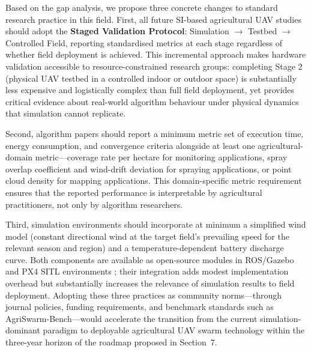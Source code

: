 \documentclass[review,3p,times]{elsarticle}
\begin{document}
Based on the gap analysis, we propose three concrete changes to standard research practice in this field. First, all future SI-based agricultural UAV studies should adopt the \textbf{Staged Validation Protocol}: Simulation $\rightarrow$ Testbed $\rightarrow$ Controlled Field, reporting standardised metrics at each stage regardless of whether field deployment is achieved. This incremental approach makes hardware validation accessible to resource-constrained research groups: completing Stage 2 (physical UAV testbed in a controlled indoor or outdoor space) is substantially less expensive and logistically complex than full field deployment, yet provides critical evidence about real-world algorithm behaviour under physical dynamics that simulation cannot replicate.

Second, algorithm papers should report a minimum metric set of execution time, energy consumption, and convergence criteria alongside at least one agricultural-domain metric---coverage rate per hectare for monitoring applications, spray overlap coefficient and wind-drift deviation for spraying applications, or point cloud density for mapping applications. This domain-specific metric requirement ensures that the reported performance is interpretable by agricultural practitioners, not only by algorithm researchers.

Third, simulation environments should incorporate at minimum a simplified wind model (constant directional wind at the target field's prevailing speed for the relevant season and region) and a temperature-dependent battery discharge curve. Both components are available as open-source modules in ROS/Gazebo and PX4 SITL environments \cite{shafiq2022}; their integration adds modest implementation overhead but substantially increases the relevance of simulation results to field deployment. Adopting these three practices as community norms---through journal policies, funding requirements, and benchmark standards such as AgriSwarm-Bench---would accelerate the transition from the current simulation-dominant paradigm to deployable agricultural UAV swarm technology within the three-year horizon of the roadmap proposed in Section~7.
\end{document}
